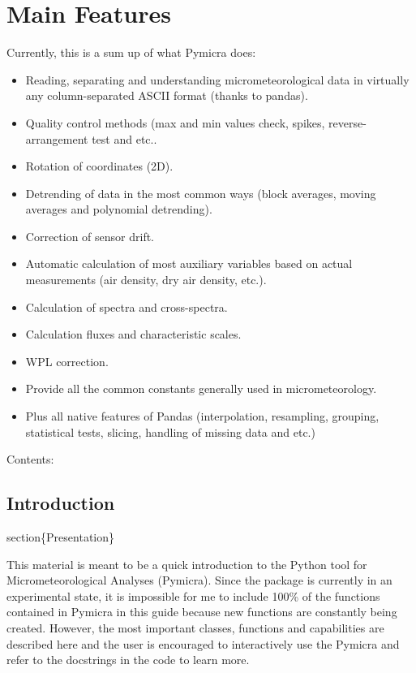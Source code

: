 \documentclass[a4paper,10pt,english]{sphinxmanual}
\begin{document}
\chapter{Main Features}
\label{index:main-features}
Currently, this is a sum up of what Pymicra does:
\begin{itemize}
\item {} 
Reading, separating and understanding micrometeorological data in
virtually any column-separated ASCII format (thanks to pandas).

\item {} 
Quality control methods (max and min values check, spikes,
reverse-arrangement test and etc..

\item {} 
Rotation of coordinates (2D).

\item {} 
Detrending of data in the most common ways (block averages, moving
averages and polynomial detrending).

\item {} 
Correction of sensor drift.

\item {} 
Automatic calculation of most auxiliary variables based on actual
measurements (air density, dry air density, etc.).

\item {} 
Calculation of spectra and cross-spectra.

\item {} 
Calculation fluxes and characteristic scales.

\item {} 
WPL correction.

\item {} 
Provide all the common constants generally used in micrometeorology.

\item {} 
Plus all native features of Pandas (interpolation, resampling,
grouping, statistical tests, slicing, handling of missing data and
etc.)

\end{itemize}

Contents:


\section{Introduction}
\label{intro:introduction}\label{intro::doc}
section\{Presentation\}

This material is meant to be a quick introduction to the Python tool for
Micrometeorological Analyses (Pymicra). Since the package is currently in an
experimental state, it is impossible for me to include 100\% of the
functions contained in Pymicra in this guide because new functions are
constantly being created. However, the most important classes, functions and
capabilities are described here and the user is encouraged to interactively use
the Pymicra and refer to the docstrings in the code to learn more.
\end{document}
